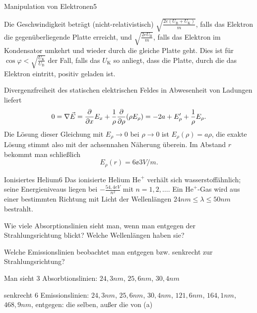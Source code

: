 \begin{problem}{Manipulation von Elektronen}{5}
\begin{solution}
\begin{abcenum}
\item Die Geschwindigkeit beträgt (nicht-relativistisch) $\sqrt{\frac{2e(U_\mathrm{B}+U_\mathrm{K})}{m}}$, falls das Elektron die gegen\-über\-liegende Platte erreicht, und $\sqrt{\frac{2eU_\mathrm{B}}{m}}$, falls das Elektron im Kondensator umkehrt und wieder durch die gleiche Platte geht. Dies ist für $\cos\varphi<\sqrt{\frac{U_\mathrm{K}}{U_\mathrm{B}}}$
der Fall, falls das $U_\mathrm{K}$ so anliegt, dass die Platte, durch die das Elektron eintritt, positiv geladen ist.\\
\item Divergenzfreiheit des statischen elektrischen Feldes in Abwesenheit von Ladungen liefert
\[
0 = \nabla \vec E = \frac{\partial}{\partial x} E_x + \frac1\rho \frac{\partial}{\partial\rho} (\rho E_\rho) = -2 a + E_\rho' + \frac{1}{\rho} E_\rho.
\]
Die Lösung dieser Gleichung mit $E_\rho \to 0$ bei $\rho \to 0$ ist $E_\rho(\rho) = a \rho$, die exakte Lösung stimmt also mit der achsennahen Näherung überein. Im Abstand $r$ bekommt man schließlich
\[
E_\rho(r)=6\ee{3}\unit{V/m}.
\]
\end{abcenum}
\end{solution}
\end{problem}


\begin{problem}{Ionisiertes Helium}{6}
Das ionisierte Helium $\mathrm{He}^+$ verhält sich wasserstoffähnlich; seine Energieniveaus liegen bei $-\frac{54,4\unit{eV}}{n^2}$ mit $n=1,2,\dots$.
Ein $\mathrm{He}^+$-Gas wird aus einer bestimmten Richtung mit Licht der Wellenlängen $24\unit{nm}\leq\lambda\leq50\unit{nm}$ bestrahlt.
\begin{abcenum}
\item Wie viele Absorptionslinien sieht man, wenn man entgegen der Strahlungsrichtung blickt? Welche Wellenlängen haben sie?
\item Welche Emissionslinien beobachtet man entgegen bzw. senkrecht zur Strahlungsrichtung?
\end{abcenum}
\begin{solution}
\begin{abcenum}
\item Man sieht 3 Absorbtionslinien: $24,3\unit{nm}$, $25,6\unit{nm}$, $30,4\unit{nm}$
\item senkrecht 6 Emissionslinien: $24,3\unit{nm}$, $25,6\unit{nm}$, $30,4\unit{nm}$, $121,6\unit{nm}$, $164,1\unit{nm}$, $468,9\unit{nm}$, entgegen: die selben, außer die von (a)
\end{abcenum}
\end{solution}
\end{problem}


